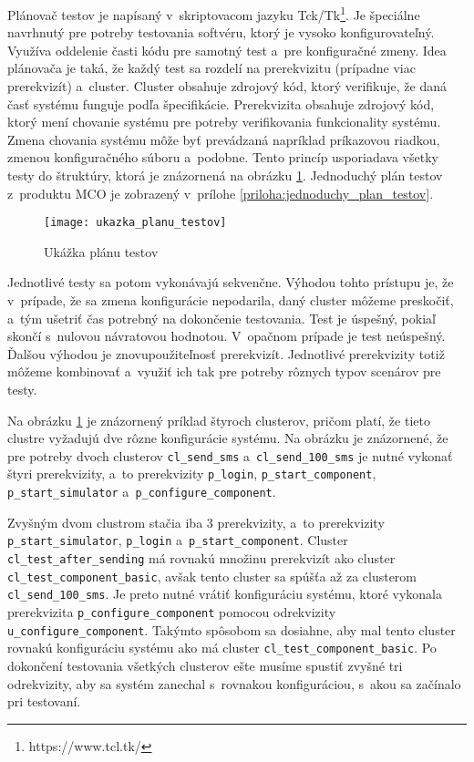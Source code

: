 Plánovač testov je napísaný v~skriptovacom jazyku Tck/Tk\footnote{https://www.tcl.tk/}. 
Je špeciálne navrhnutý pre potreby testovania softvéru, ktorý je vysoko 
konfigurovateľný. Využíva oddelenie časti kódu pre samotný test
a~pre konfiguračné zmeny. Idea plánovača je taká, že každý test sa 
rozdelí na prerekvizitu (prípadne viac prerekvizít) a~cluster. Cluster 
obsahuje zdrojový kód, ktorý verifikuje, že daná časť systému funguje 
podľa špecifikácie. Prerekvizita obsahuje zdrojový kód, ktorý mení 
chovanie systému pre potreby verifikovania funkcionality systému.
Zmena chovania systému môže byť prevádzaná napríklad príkazovou riadkou, 
zmenou konfiguračného súboru a~podobne.
Tento princíp usporiadava všetky testy do štruktúry, ktorá je znázornená 
na obrázku \ref{obrazok:ukazka_planu_testov}. Jednoduchý plán testov
z~produktu MCO je zobrazený v~prílohe \ref{priloha:jednoduchy_plan_testov}.

\begin{figure}[h]
  \begin{center}
    \texttt{[image: ukazka\_planu\_testov]}
    \caption{Ukážka plánu testov}
    \label{obrazok:ukazka_planu_testov}
  \end{center}
\end{figure}

Jednotlivé testy sa potom vykonávajú sekvenčne. Výhodou tohto prístupu 
je, že v~prípade, že sa zmena konfigurácie nepodarila, daný cluster 
môžeme preskočiť, a~tým ušetriť čas potrebný na dokončenie testovania. 
Test je úspešný, pokiaľ skončí s~nulovou návratovou hodnotou. 
V~opačnom prípade je test neúspešný.  
Ďalšou výhodou je znovupoužiteľnosť prerekvizít. 
Jednotlivé prerekvizity totiž môžeme kombinovať a~využiť ich tak pre 
potreby rôznych typov scenárov pre testy. 

Na obrázku \ref{obrazok:ukazka_planu_testov} je znázornený príklad štyroch 
clusterov, pričom platí, že tieto clustre vyžadujú dve rôzne konfigurácie
systému. 
Na obrázku je znázornené, že pre potreby dvoch clusterov \texttt{cl\_send\_sms}
a~\texttt{cl\_send\_100\_sms} je nutné vykonať štyri prerekvizity, a~to 
prerekvizity \texttt{p\_login}, \texttt{p\_start\_component}, 
\texttt{p\_start\_simulator} a~\texttt{p\_configure\_component}. 

Zvyšným dvom clustrom stačia iba 3 prerekvizity, a~to prerekvizity
\texttt{p\_start\_simulator}, \texttt{p\_login} 
a~\texttt{p\_start\_component}. Cluster \texttt{cl\_test\_after\_sending} 
má rovnakú množinu prerekvizít ako cluster \texttt{cl\_test\_component\_basic}, 
avšak tento cluster sa spúšťa až za clusterom \texttt{cl\_send\_100\_sms}. 
Je preto nutné vrátiť konfiguráciu systému, ktoré vykonala prerekvizita 
\texttt{p\_configure\_component} pomocou odrekvizity
\texttt{u\_configure\_component}. 
Takýmto spôsobom sa dosiahne, aby mal tento cluster rovnakú konfiguráciu 
systému ako má cluster \texttt{cl\_test\_component\_basic}.
Po dokončení testovania všetkých clusterov ešte musíme spustiť zvyšné tri
odrekvizity, aby sa systém zanechal s~rovnakou konfiguráciou, s~akou 
sa začínalo pri testovaní.

